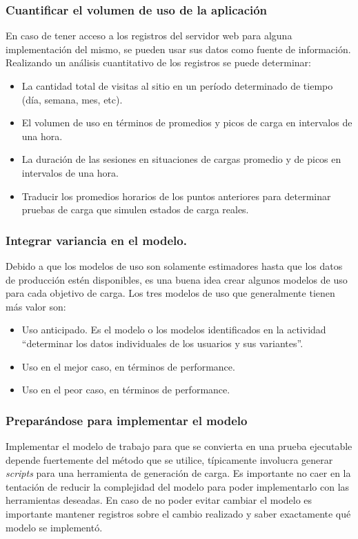 \subsubsection{Cuantificar el volumen de uso de la aplicación}
En caso de tener acceso a los registros del servidor web para alguna implementación del mismo, se pueden usar sus datos como fuente de información. Realizando un análisis
cuantitativo de los registros se puede determinar:
\begin{itemize}
	\item
	La cantidad total de visitas al sitio en un período determinado de tiempo (día, semana, mes, etc).
	\item
	El volumen de uso en términos de promedios y picos de carga en intervalos de una hora.
	\item
	La duración de las sesiones en situaciones de cargas promedio y de picos en intervalos de una hora.
	\item
	Traducir los promedios horarios de los puntos anteriores para determinar pruebas de carga que simulen estados de carga reales.
\end{itemize}

\subsubsection{Integrar variancia en el modelo.}
Debido a que los modelos de uso son solamente estimadores hasta que los datos de producción estén disponibles, es una buena idea crear algunos modelos de uso para cada
objetivo de carga. Los tres modelos de uso que generalmente tienen más valor son:
\begin{itemize}
	\item
	Uso anticipado. Es el modelo o los modelos identificados en la actividad ``determinar los datos individuales de los usuarios y sus variantes''.
	\item
	Uso en el mejor caso, en términos de performance.
	\item
	Uso en el peor caso, en términos de performance.
\end{itemize}

\subsubsection{Preparándose para implementar el modelo}

Implementar el modelo de trabajo para que se convierta en una prueba ejecutable depende fuertemente del método que se utilice, típicamente involucra generar \emph{scripts} para
una herramienta de generación de carga. Es importante no caer en la tentación de reducir la complejidad del modelo para poder implementarlo con las herramientas deseadas. En
caso de no poder evitar cambiar el modelo es importante mantener registros sobre el cambio realizado y saber exactamente qué modelo se implementó.

